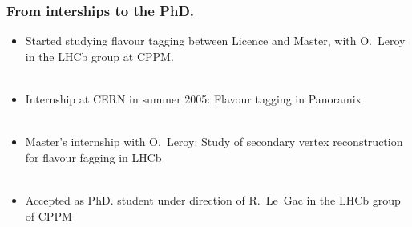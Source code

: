 \documentclass{beamer}
\begin{document}
{

\begin{frame}
\frametitle{From interships to the PhD.}
\begin{itemize}
  \item Started studying \alert{flavour tagging} between Licence and Master,
  with O.~Leroy in the {\color{blue} LHCb group at CPPM}.\\
  ~\\
  \item Internship at \alert{CERN in summer 2005}: Flavour tagging in Panoramix\\
  ~\\
  \item Master's {\color{blue} internship with O.~Leroy}: Study of secondary
  vertex reconstruction for flavour fagging in LHCb\\
  ~\\
  \item \alert{Accepted as PhD. student} under direction of R.~Le~Gac in the
  LHCb group of CPPM
\end{itemize}
\end{frame}
}
\end{document}
